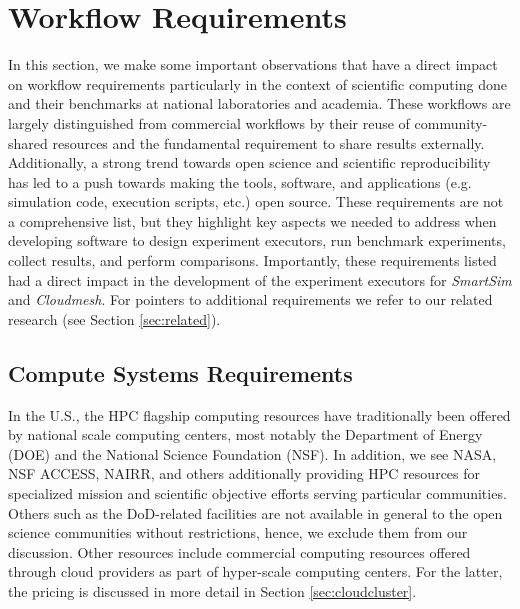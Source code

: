 \documentclass[sigconf]{acmart}
\begin{document}

\section{Workflow Requirements}
\label{sec:requirements}

In this section, we make some important observations that have a direct impact on workflow requirements particularly in the context of scientific computing done and their benchmarks at national laboratories and academia. These workflows are largely distinguished from commercial workflows by their reuse of community-shared resources and the fundamental requirement to share results externally. Additionally, a strong trend towards open science and scientific reproducibility has led to a push towards making the tools, software, and applications (e.g. simulation code, execution scripts, etc.) open source.  These requirements are not a comprehensive list, but they highlight key aspects we needed to address when developing software to design experiment executors, run benchmark experiments, collect results, and perform comparisons. Importantly,  these requirements listed had a direct impact in the development of the experiment executors for {\em SmartSim} and {\em Cloudmesh}. For pointers to additional requirements we refer to our related research (see Section \ref{sec:related}).

\subsection{Compute Systems Requirements}\label{sec:hw-requirements}

In the U.S., the HPC flagship computing resources have traditionally been offered by national scale computing centers, most notably the Department of Energy (DOE) and the National Science Foundation (NSF). In addition, we see NASA, NSF ACCESS, NAIRR, and others additionally providing HPC resources for specialized mission and scientific objective efforts serving particular communities. Others such as the DoD-related facilities are not available in general to the open science communities without restrictions, hence, we exclude them from our discussion. Other resources include commercial computing resources offered through cloud providers as part of hyper-scale computing centers. For the latter, the pricing is discussed in more detail in Section \ref{sec:cloudcluster}.
\end{document}
